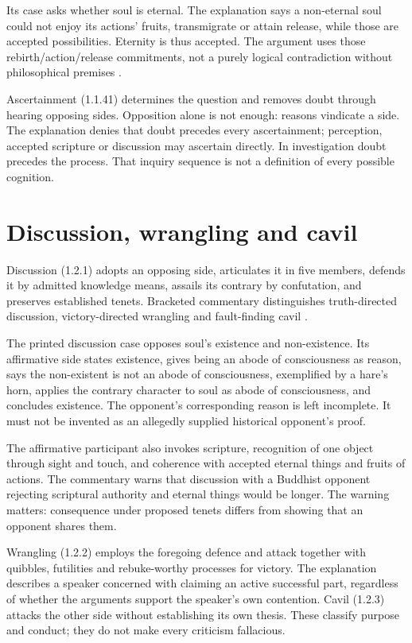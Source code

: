 Its case asks whether soul is eternal. The explanation says a non-eternal
soul could not enjoy its actions' fruits, transmigrate or attain release,
while those are accepted possibilities. Eternity is thus accepted.
The argument uses those rebirth/action/release commitments, not a purely
logical contradiction without philosophical premises
\cite[1.1.40--41, p.~13]{GotamaVidyabhusana1913NyayaSutras}.

Ascertainment (1.1.41) determines the question and removes doubt through
hearing opposing sides. Opposition alone is not enough: reasons vindicate
a side. The explanation denies that doubt precedes every ascertainment;
perception, accepted scripture or discussion may ascertain directly.
In investigation doubt precedes the process. That inquiry sequence is not
a definition of every possible cognition.

\section{Discussion, wrangling and cavil}
\label{sec:p13-nyaya-debate-forms}

Discussion (1.2.1) adopts an opposing side, articulates it in five members,
defends it by admitted knowledge means, assails its contrary by confutation,
and preserves established tenets. Bracketed commentary distinguishes
truth-directed discussion, victory-directed wrangling and fault-finding cavil
\cite[1.2.1--3, pp.~14--15]{GotamaVidyabhusana1913NyayaSutras}.

The printed discussion case opposes soul's existence and non-existence.
Its affirmative side states existence, gives being an abode of consciousness
as reason, says the non-existent is not an abode of consciousness, exemplified
by a hare's horn, applies the contrary character to soul as abode of
consciousness, and concludes existence. The opponent's corresponding reason
is left incomplete. It must not be invented as an allegedly supplied
historical opponent's proof.

The affirmative participant also invokes scripture, recognition of one
object through sight and touch, and coherence with accepted eternal things
and fruits of actions. The commentary warns that discussion with a Buddhist
opponent rejecting scriptural authority and eternal things would be longer.
The warning matters: consequence under proposed tenets differs from showing
that an opponent shares them.

Wrangling (1.2.2) employs the foregoing defence and attack together with
quibbles, futilities and rebuke-worthy processes for victory. The explanation
describes a speaker concerned with claiming an active successful part,
regardless of whether the arguments support the speaker's own contention.
Cavil (1.2.3) attacks the other side without establishing its own thesis.
These classify purpose and conduct; they do not make every criticism fallacious.

